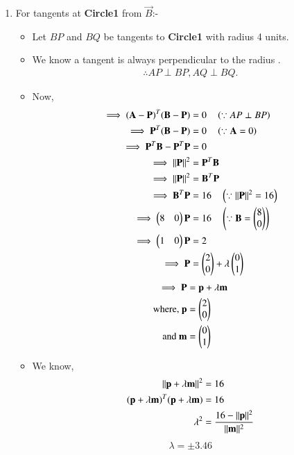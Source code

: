 \documentclass[journal,12pt,twocolumn]{IEEEtran}
\begin{document}
\begin{enumerate}
    \item For tangents at \textbf{Circle1} from $\vec{B}$:-
\begin{itemize}
\item Let $BP$ and $BQ$  be tangents to \textbf{Circle1} with radius 4 units.
\item We know a tangent is always perpendicular to the radius .
\begin{align}
\therefore AP \perp BP ,  AQ \perp BQ.
\end{align}
\item Now,
\begin{align}
 \implies (\mathbf{A}-\mathbf{P})^T (\mathbf{B}-\mathbf{P}) &= 0 \quad \left(\because AP \perp BP \right)
 \\
 \implies\mathbf{P}^T(\mathbf{B}-\mathbf{P})&= 0 \quad \left(\because \mathbf{A}=0\right)
 \\
  \implies\mathbf{P}^T \mathbf{B} - \mathbf{P}^T \mathbf{P} &= 0  
  \\
  \implies\lVert\mathbf{P}\rVert^2 &= \mathbf{P}^T \mathbf{B}
  \\
 \implies \lVert\mathbf{P}\rVert^2 &= \mathbf{B}^T \mathbf{P} 
  \\
  \implies \mathbf{B}^T \mathbf{P} &= 16 \quad \left(\because \lVert\mathbf{P}\rVert^2 = 16\right)
  \\
  \implies \begin{pmatrix}8&0\end{pmatrix} \mathbf{P} &= 16 \quad \left(\because \mathbf{B} = \begin{pmatrix}8\\0\end{pmatrix} \right)
  \\
   \implies\begin{pmatrix}1&0\end{pmatrix} \mathbf{P} &= 2
   \\
   \implies\mathbf{P} &= \begin{pmatrix}2\\0\end{pmatrix} + \lambda \begin{pmatrix}0\\1\end{pmatrix} 
    \end{align}
    \begin{align}
    \implies \mathbf{P}&=\mathbf{p}+\lambda\mathbf{m} \label{eqa}
   \\
   \text{where, }\mathbf{p}&=\begin{pmatrix}2\\ 0\end{pmatrix}
   \\
   \text{and }\mathbf{m}&=\begin{pmatrix}0\\1\end{pmatrix}
\end{align}
\item We know,
\begin{align}
\lVert\mathbf{p}+\lambda\mathbf{m}\rVert^2&=16
\\
(\mathbf{p}+\lambda \mathbf{m})^T(\mathbf{p}+\lambda \mathbf{m})&=16
\\
\lambda^2&=\frac{16-\lVert\mathbf{p}\rVert^2}{\lVert\mathbf{m}\rVert^2}
\end{align}
\begin{align}
  \lambda = \pm 3.46  
\end{align}



\end{itemize}
\end{enumerate}
\end{document}

